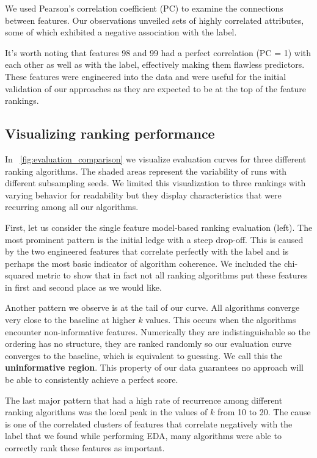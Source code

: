 \documentclass[fleqn,moreauthors,10pt]{ds_report}
\begin{document}
We used Pearson's correlation coefficient (PC) to examine the connections between features. Our observations unveiled sets of highly correlated attributes, some of which exhibited a negative association with the label.

It's worth noting that features 98 and 99 had a perfect correlation (PC = 1) with each other as well as with the label, effectively making them flawless predictors. These features were engineered into the data and were useful for the initial validation of our approaches as they are expected to be at the top of the feature rankings.


\subsection*{Visualizing ranking performance}

In \figurename~\ref{fig:evaluation_comparison} we visualize evaluation curves for three different ranking algorithms. The shaded areas represent the variability of runs with different subsampling seeds. We limited this visualization to three rankings with varying behavior for readability but they display characteristics that were recurring among all our algorithms.

First, let us consider the single feature model-based ranking evaluation (left). The most prominent pattern is the initial ledge with a steep drop-off. This is caused by the two engineered features that correlate perfectly with the label and is perhaps the most basic indicator of algorithm coherence. We included the chi-squared metric to show that in fact not all ranking algorithms put these features in first and second place as we would like.

Another pattern we observe is at the tail of our curve. All algorithms converge very close to the baseline at higher $k$ values. This occurs when the algorithms encounter non-informative features. Numerically they are indistinguishable so the ordering has no structure, they are ranked randomly so our evaluation curve converges to the baseline, which is equivalent to guessing. We call this the \textbf{uninformative region}. This property of our data guarantees no approach will be able to consistently achieve a perfect score.

The last major pattern that had a high rate of recurrence among different ranking algorithms was the local peak in the values of $k$ from 10 to 20. The cause is one of the correlated clusters of features that correlate negatively with the label that we found while performing EDA, many algorithms were able to correctly rank these features as important.
\end{document}

